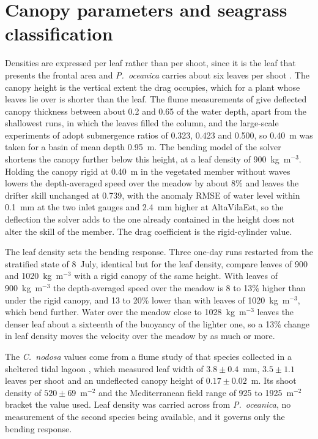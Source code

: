 \documentclass[12pt]{article}
\begin{document}
\section{Canopy parameters and seagrass classification}
\label{sec:s_canopy}

Densities are expressed per leaf rather than per shoot, since it is the leaf
that presents the frontal area and \emph{P.\ oceanica} carries about six leaves
per shoot \citep{CiraoloFerreri2006}. The canopy height is the vertical extent
the drag occupies, which for a plant whose leaves lie over is shorter than the
leaf. The flume measurements of \citet{CiraoloFerreri2006} give deflected
canopy thickness between about 0.2 and 0.65 of the water depth, apart from the
shallowest runs, in which the leaves filled the column, and the large-scale
experiments of \citet{Prinos2010} adopt submergence ratios of 0.323, 0.423 and
0.500, so 0.40~m was taken for a basin of mean depth 0.95~m. The bending model
of the solver shortens the canopy further below this height, at a leaf density
of 900~kg~m$^{-3}$. Holding the canopy rigid at 0.40~m in the
vegetated member without waves lowers the depth-averaged speed over the meadow
by about 8\% and leaves the drifter skill unchanged at 0.739, with the anomaly
RMSE of water level within 0.1~mm at the two inlet gauges and 2.4~mm higher at
AltaVilaEst, so the deflection the solver adds to the one already contained in
the height does not alter the skill of the member. The drag coefficient is
the rigid-cylinder value.

The leaf density sets the bending response. Three one-day runs restarted from
the stratified state of 8~July, identical but for the leaf density, compare
leaves of 900 and 1020~kg~m$^{-3}$ with a rigid canopy of the same height.
With leaves of 900~kg~m$^{-3}$ the depth-averaged speed over the meadow is 8 to
13\% higher than under the rigid canopy, and 13 to 20\% lower than with leaves
of 1020~kg~m$^{-3}$, which bend further. Water over the
meadow close to 1028~kg~m$^{-3}$ leaves the denser leaf about a sixteenth of
the buoyancy of the lighter one, so a 13\% change in leaf density moves the
velocity over the meadow by as much or more.

The \emph{C.\ nodosa} values come from a flume study of that species collected
in a sheltered tidal lagoon \citep{Morris2008}, which measured leaf width of
$3.8 \pm 0.4$~mm, $3.5 \pm 1.1$ leaves per shoot and an undeflected canopy
height of $0.17 \pm 0.02$~m. Its shoot density of $520 \pm 69$~m$^{-2}$ and the
Mediterranean field range of 925 to 1925~m$^{-2}$ \citep{Cancemi2002} bracket
the value used. Leaf density was carried across from \emph{P.\ oceanica}, no
measurement of the second species being available, and it governs only the
bending response.
\end{document}
